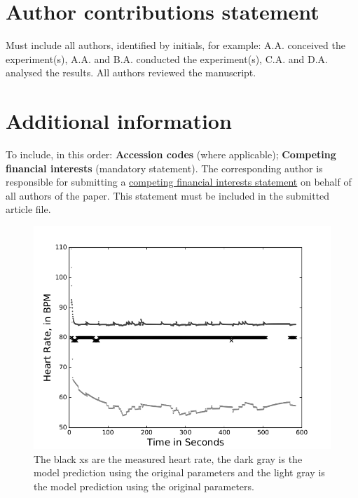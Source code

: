 \documentclass[fleqn,10pt]{wlscirep}
\begin{document}
\section*{Author contributions statement}
Must include all authors, identified by initials, for example:
A.A. conceived the experiment(s),  A.A. and B.A. conducted the experiment(s), C.A. and D.A. analysed the results.  All authors reviewed the manuscript. 
\section*{Additional information}
To include, in this order: \textbf{Accession codes} (where applicable); \textbf{Competing financial interests} (mandatory statement). 
The corresponding author is responsible for submitting a \href{http://www.nature.com/srep/policies/index.html#competing}{competing financial interests statement} on behalf of all authors of the paper. This statement must be included in the submitted article file.


\begin{figure}[ht]
                \centering
        \includegraphics[width=\linewidth]{figures/s27193-3271-03-15-13-26n}
       \caption{The black xs are the measured heart rate, the dark gray is the model prediction using the original parameters and the light gray is the model prediction using the original parameters.}
       \label{fig:paramscomparsionNLopt}
\end{figure}
\end{document}
